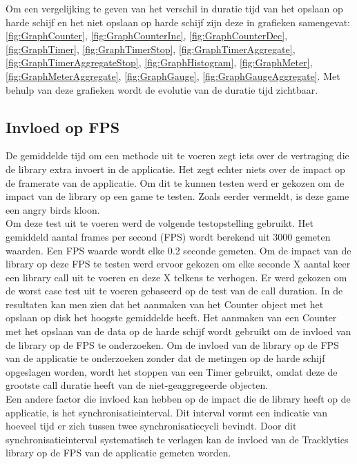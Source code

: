 Om een vergelijking te geven van het verschil in duratie tijd van het opslaan op harde schijf en het niet opslaan op harde schijf zijn deze in grafieken samengevat: \ref{fig:GraphCounter}, \ref{fig:GraphCounterInc}, \ref{fig:GraphCounterDec}, \ref{fig:GraphTimer}, \ref{fig:GraphTimerStop}, \ref{fig:GraphTimerAggregate}, \ref{fig:GraphTimerAggregateStop}, \ref{fig:GraphHistogram}, \ref{fig:GraphMeter}, \ref{fig:GraphMeterAggregate}, \ref{fig:GraphGauge}, \ref{fig:GraphGaugeAggregate}. Met behulp van deze grafieken wordt de evolutie van de duratie tijd zichtbaar. 

\subsection{Invloed op FPS}
De gemiddelde tijd om een methode uit te voeren zegt iets over de vertraging die de library extra invoert in de applicatie. Het zegt echter niets over de impact op de framerate van de applicatie. Om dit te kunnen testen werd er gekozen om de impact van de library op een game te testen. Zoals eerder vermeldt, is deze game een angry birds kloon. \\

Om deze test uit te voeren werd de volgende testopstelling gebruikt. Het gemiddeld aantal frames per second (FPS) wordt berekend uit 3000 gemeten waarden. Een FPS waarde wordt elke 0.2 seconde gemeten. Om de impact van de library op deze FPS te testen werd ervoor gekozen om elke seconde X aantal keer een library call uit te voeren en deze X telkens te verhogen. Er werd gekozen om de worst case test uit te voeren gebaseerd op de test van de call duration. In de resultaten kan men zien dat het aanmaken van het Counter object met het opslaan op disk het hoogste gemiddelde heeft. Het aanmaken van een Counter met het opslaan van de data op de harde schijf wordt gebruikt om de invloed van de library op de FPS te onderzoeken. Om de invloed van de library op de FPS van de applicatie te onderzoeken zonder dat de metingen op de harde schijf opgeslagen worden, wordt het stoppen van een Timer gebruikt, omdat deze de grootste call duratie heeft van de niet-geaggregeerde objecten. \\

Een andere factor die invloed kan hebben op de impact die de library heeft op de applicatie, is het synchronisatieinterval. Dit interval vormt een indicatie van hoeveel tijd er zich tussen twee synchronisatiecycli bevindt. Door dit synchronisatieinterval systematisch te verlagen kan de invloed van de Tracklytics library op de FPS van de applicatie gemeten worden. \\

